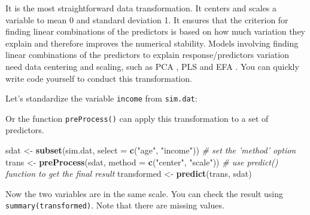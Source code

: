 \documentclass[12pt,]{krantz}
\makeatletter
\newenvironment{Shaded}{\begin{snugshade}}{\end{snugshade}}
\newcommand{\CommentTok}[1]{\textcolor[rgb]{0.37,0.37,0.37}{\textit{#1}}}
\newcommand{\DataTypeTok}[1]{\textcolor[rgb]{0.27,0.27,0.27}{#1}}
\newcommand{\KeywordTok}[1]{\textcolor[rgb]{0.27,0.27,0.27}{\textbf{#1}}}
\newcommand{\NormalTok}[1]{#1}
\newcommand{\OperatorTok}[1]{\textcolor[rgb]{0.43,0.43,0.43}{\textbf{#1}}}
\newcommand{\StringTok}[1]{\textcolor[rgb]{0.5,0.5,0.5}{#1}}
\newenvironment{kframe}{%
\medskip{}
\setlength{\fboxsep}{.8em}
 \def\at@end@of@kframe{}%
 \ifinner\ifhmode%
  \def\at@end@of@kframe{\end{minipage}}%
  \begin{minipage}{\columnwidth}%
 \fi\fi%
 \def\FrameCommand##1{\hskip\@totalleftmargin \hskip-\fboxsep
 \colorbox{shadecolor}{##1}\hskip-\fboxsep
     \hskip-\linewidth \hskip-\@totalleftmargin \hskip\columnwidth}%
 \MakeFramed {\advance\hsize-\width
   \@totalleftmargin\z@ \linewidth\hsize
   \@setminipage}}%
 {\par\unskip\endMakeFramed%
 \at@end@of@kframe}
\renewenvironment{Shaded}{\begin{kframe}}{\end{kframe}}
\makeatother
\begin{document}
It is the most straightforward data transformation. It centers and scales a variable to mean 0 and standard deviation 1. It ensures that the criterion for finding linear combinations of the predictors is based on how much variation they explain and therefore improves the numerical stability. Models involving finding linear combinations of the predictors to explain response/predictors variation need data centering and scaling, such as PCA \citep{pca1}, PLS \citep{PLS1} and EFA \citep{EFA1}. You can quickly write code yourself to conduct this transformation.

Let's standardize the variable \texttt{income} from \texttt{sim.dat}:

\begin{Shaded}
\end{Shaded}

Or the function \texttt{preProcess()} can apply this transformation to a set of predictors.

\begin{Shaded}
\begin{Highlighting}[]
\NormalTok{sdat <-}\StringTok{ }\KeywordTok{subset}\NormalTok{(sim.dat, }\DataTypeTok{select =} \KeywordTok{c}\NormalTok{(}\StringTok{"age"}\NormalTok{, }\StringTok{"income"}\NormalTok{))}
\CommentTok{# set the 'method' option}
\NormalTok{trans <-}\StringTok{ }\KeywordTok{preProcess}\NormalTok{(sdat, }\DataTypeTok{method =} \KeywordTok{c}\NormalTok{(}\StringTok{"center"}\NormalTok{, }\StringTok{"scale"}\NormalTok{))}
\CommentTok{# use predict() function to get the final result}
\NormalTok{transformed <-}\StringTok{ }\KeywordTok{predict}\NormalTok{(trans, sdat)}
\end{Highlighting}
\end{Shaded}

Now the two variables are in the same scale. You can check the result using \texttt{summary(transformed)}. Note that there are missing values.
\end{document}

